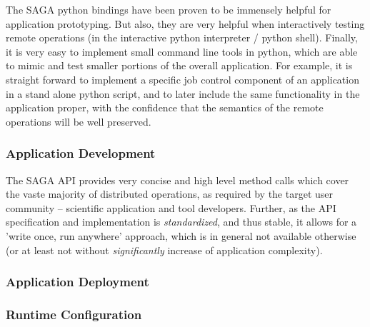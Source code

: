 \documentclass[12pt]{article}
\newcommand{\I}[1]{\textit{#1}}
\begin{document}
   The SAGA python bindings have been proven to be immensely helpful
   for application prototyping.  But also, they are very helpful when
   interactively testing remote operations (in the interactive python
   interpreter / python shell).  Finally, it is very easy to implement
   small command line tools in python, which are able to mimic and
   test smaller portions of the overall application.  For example, it
   is straight forward to implement a specific job control component
   of an application in a stand alone python script, and to later
   include the same functionality in the application proper, with the
   confidence that the semantics of the remote operations will be well
   preserved. %


 \subsubsection*{Application Development}


  The SAGA API provides very concise and high level method calls which
  cover the vaste majority of distributed operations, as required by
  the target user community -- scientific application and tool
  developers.  Further, as the API specification and implementation is
  \I{standardized}, and thus stable, it allows for a 'write once, run
  anywhere' approach, which is in general not available otherwise (or
  at least not without \I{significantly} increase of application
  complexity).

\subsubsection*{Application Deployment}

\subsubsection*{Runtime Configuration}
\end{document}
